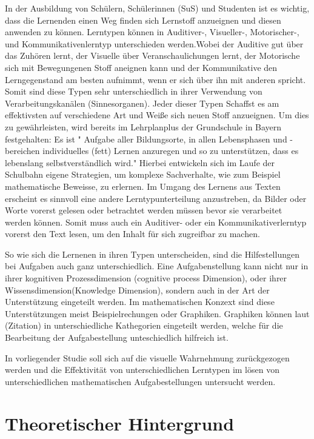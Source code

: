 In der Ausbildung von Schülern, Schülerinnen (SuS) und Studenten ist es wichtig, dass die Lernenden
einen Weg finden sich Lernstoff anzueignen und diesen anwenden zu können. Lerntypen können in Auditiver-,
Visueller-, Motorischer-, und Kommunikativenlerntyp unterschieden werden.Wobei der Auditive gut über das Zuhören
lernt, der Visuelle über Veranschaulichungen lernt, der Motorische sich mit Bewegungenen Stoff aneignen kann und 
der Kommunikative den Lerngegenstand am besten aufnimmt, wenn er sich über ihn mit anderen spricht.  Somit sind diese Typen sehr unterschiedlich in ihrer Verwendung von Verarbeitungskanälen (Sinnesorganen).
Jeder dieser Typen Schaffst es am effektivsten auf verschiedene Art und Weiße sich neuen Stoff anzueignen.
Um dies zu gewährleisten, wird bereits im Lehrplanplus der Grundschule in Bayern festgehalten:
Es ist " Aufgabe aller Bildungsorte, in allen Lebensphasen und -bereichen individuelles (fett)
 Lernen anzuregen und so zu unterstützen, dass es lebenslang selbstverständlich wird."
Hierbei entwickeln sich im Laufe der Schulbahn eigene Strategien, um komplexe Sachverhalte,
wie zum Beispiel mathematische Beweisse, zu erlernen. 
Im Umgang des Lernens aus Texten erscheint
es sinnvoll eine andere Lerntypunterteilung anzustreben, da Bilder oder Worte vorerst gelesen oder 
betrachtet werden müssen bevor sie verarbeitet werden können. Somit muss auch ein Auditiver- oder ein Kommunikativerlerntyp vorerst den Text lesen, um den Inhalt für sich zugreifbar zu machen. 

So wie sich die Lernenen in ihren Typen unterscheiden, sind die Hilfestellungen bei Aufgaben auch ganz unterschiedlich. Eine Aufgabenstellung kann nicht nur in ihrer kognitiven Prozessdimension (cognitive process Dimension), oder ihrer Wissensdimension(Knowledge Dimension), sondern auch in der Art der Unterstützung eingeteilt werden. Im mathematischen Konzext sind diese Unterstützungen meist Beispielrechungen oder Graphiken. Graphiken können laut (Zitation) in unterschiedliche Kathegorien eingeteilt werden, welche für die Bearbeitung der Aufgabestellung unteschiedlich hilfreich ist.%

In vorliegender Studie soll sich auf die visuelle Wahrnehmung zurückgezogen werden und die Effektivität von unterschiedlichen Lerntypen im lösen von unterschiedlichen mathematischen Aufgabestellungen untersucht werden. 
\chapter{Theoretischer Hintergrund}

